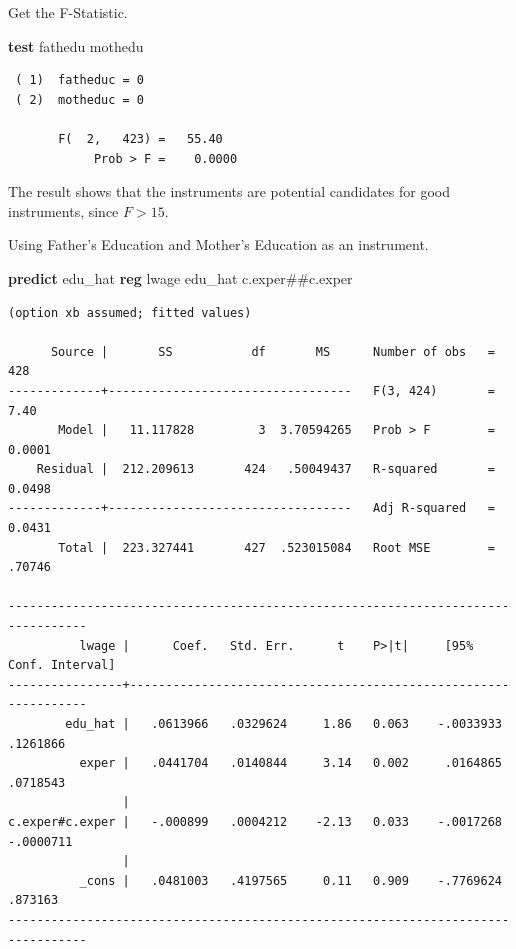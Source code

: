 \documentclass[
]{book}
\newenvironment{Shaded}{\begin{snugshade}}{\end{snugshade}}
\newcommand{\KeywordTok}[1]{\textcolor[rgb]{0.13,0.29,0.53}{\textbf{#1}}}
\newcommand{\NormalTok}[1]{#1}
\begin{document}
Get the F-Statistic.

\begin{Shaded}
\begin{Highlighting}[]
\KeywordTok{test}\NormalTok{ fathedu mothedu}
\end{Highlighting}
\end{Shaded}

\begin{verbatim}
 ( 1)  fatheduc = 0
 ( 2)  motheduc = 0

       F(  2,   423) =   55.40
            Prob > F =    0.0000
\end{verbatim}

The result shows that the instruments are potential candidates for good instruments, since \(F>15\).

Using Father's Education and Mother's Education as an instrument.

\begin{Shaded}
\begin{Highlighting}[]
\KeywordTok{predict}\NormalTok{ edu\_hat}
\KeywordTok{reg}\NormalTok{ lwage edu\_hat c.exper\#\#c.exper}
\end{Highlighting}
\end{Shaded}

\begin{verbatim}
(option xb assumed; fitted values)

      Source |       SS           df       MS      Number of obs   =       428
-------------+----------------------------------   F(3, 424)       =      7.40
       Model |   11.117828         3  3.70594265   Prob > F        =    0.0001
    Residual |  212.209613       424   .50049437   R-squared       =    0.0498
-------------+----------------------------------   Adj R-squared   =    0.0431
       Total |  223.327441       427  .523015084   Root MSE        =    .70746

---------------------------------------------------------------------------------
          lwage |      Coef.   Std. Err.      t    P>|t|     [95% Conf. Interval]
----------------+----------------------------------------------------------------
        edu_hat |   .0613966   .0329624     1.86   0.063    -.0033933    .1261866
          exper |   .0441704   .0140844     3.14   0.002     .0164865    .0718543
                |
c.exper#c.exper |   -.000899   .0004212    -2.13   0.033    -.0017268   -.0000711
                |
          _cons |   .0481003   .4197565     0.11   0.909    -.7769624     .873163
---------------------------------------------------------------------------------
\end{verbatim}
\end{document}
